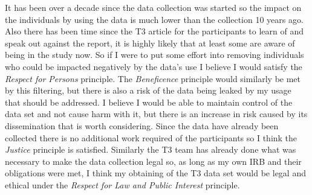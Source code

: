 \documentclass[10pt,a4paper,twocolumn]{article}
\begin{document}
It has been over a decade since the data collection was started so the impact on the individuals by using the data is much lower than the collection 10 years ago. Also there has been time since the T3 article for the participants to learn of and speak out against the report, it is highly likely that at least some are aware of being in the study now. So if I were to put some effort into removing individuals who could be impacted negatively by the data's use I believe I would satisfy the \textit{Respect for Persons} principle. The \textit{Beneficence} principle would similarly be met by this filtering, but there is also a risk of the data being leaked by my usage that should be addressed. I believe I would be able to maintain control of the data set and not cause harm with it, but there is an increase in risk caused by its dissemination that is worth considering. Since the data have already been collected there is no additional work required of the participants so I think the \textit{Justice} principle is satisfied. Similarly the T3 team has already done what was necessary to make the data collection legal so, as long as my own IRB and their obligations were met, I think my obtaining of the T3 data set would be legal and ethical under the \textit{Respect for Law and Public Interest} principle. 

\clearpage
{}

\end{document}
